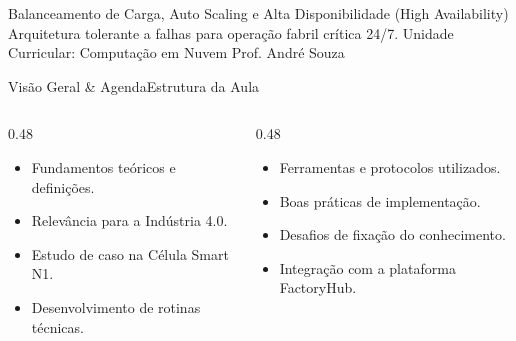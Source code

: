 
\senaicover
  {Balanceamento de Carga, Auto Scaling e Alta Disponibilidade (High Availability)}
  {Arquitetura tolerante a falhas para operação fabril crítica 24/7.}
  {Unidade Curricular: Computação em Nuvem}
  {Prof. André Souza}

\begin{senaiframe}{Visão Geral \& Agenda}{Estrutura da Aula}
  \begin{columns}[t]
    \begin{column}{0.48\textwidth}
      \begin{tcolorbox}[senaibluecard, title={1. Conceitos Chave}]
        \begin{itemize}
          \item Fundamentos teóricos e definições.
          \item Relevância para a Indústria 4.0.
        \end{itemize}
      \end{tcolorbox}
      \vspace{4pt}
      \begin{tcolorbox}[senaiambercard, title={3. Aplicação Prática}]
        \begin{itemize}
          \item Estudo de caso na Célula Smart N1.
          \item Desenvolvimento de rotinas técnicas.
        \end{itemize}
      \end{tcolorbox}
    \end{column}
    \begin{column}{0.48\textwidth}
      \begin{tcolorbox}[senairedcard, title={2. Detalhamento Técnico}]
        \begin{itemize}
          \item Ferramentas e protocolos utilizados.
          \item Boas práticas de implementação.
        \end{itemize}
      \end{tcolorbox}
      \vspace{4pt}
      \begin{tcolorbox}[senaigreencard, title={4. Exercícios \& Avaliação}]
        \begin{itemize}
          \item Desafios de fixação do conhecimento.
          \item Integração com a plataforma FactoryHub.
        \end{itemize}
      \end{tcolorbox}
    \end{column}
  \end{columns}
\end{senaiframe}

